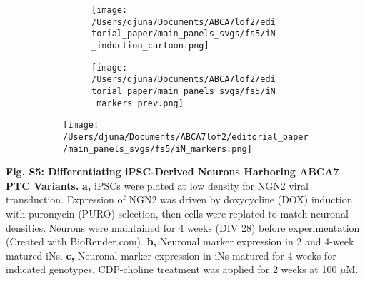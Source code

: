 \documentclass[12pt]{article}
\begin{document}
\begin{figure}[H]
    \begin{subfigure}[t]{\textwidth}
        \begin{subfigure}[t]{0.45\textwidth}
            \caption{}
            \texttt{[image: /Users/djuna/Documents/ABCA7lof2/editorial\_paper/main\_panels\_svgs/fs5/iN\_induction\_cartoon.png]}        
        \end{subfigure}
        \begin{subfigure}[t]{0.45\textwidth}
            \caption{}
            \texttt{[image: /Users/djuna/Documents/ABCA7lof2/editorial\_paper/main\_panels\_svgs/fs5/iN\_markers\_prev.png]}        
        \end{subfigure}
    \end{subfigure}
    \begin{subfigure}[t]{0.8\textwidth}
        \caption{}
        \hspace{2cm}
        \texttt{[image: /Users/djuna/Documents/ABCA7lof2/editorial\_paper/main\_panels\_svgs/fs5/iN\_markers.png]}        
    \end{subfigure}
\end{figure}
\textbf{Fig. S5: Differentiating iPSC-Derived Neurons Harboring ABCA7 PTC Variants.}
\textbf{a,} iPSCs were plated at low density for NGN2 viral transduction. Expression of NGN2 was driven by doxycycline (DOX) induction with puromycin (PURO) selection, then cells were replated to match neuronal densities. Neurons were maintained for 4 weeks (DIV 28) before experimentation (Created with BioRender.com). 
\textbf{b,} Neuronal marker expression in 2 and 4-week matured iNs. 
\textbf{c,} Neuronal marker expression in iNs matured for 4 weeks for indicated genotypes. CDP-choline treatment was applied for 2 weeks at 100 $\mu$M.
\end{document}
